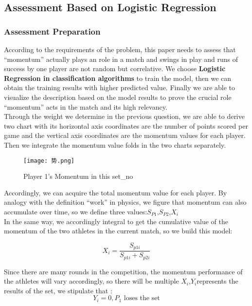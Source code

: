 \documentclass{mcmthesis}
\begin{document}
\subsection{Assessment Based on Logistic Regression}

\subsubsection{Assessment Preparation}
According to the requirements of the problem, this paper needs to assess that “momentum”
actually plays an role in a match and swings in play and runs of success by one player are not
random but correlative. We choose {\bf Logistic Regression in classification algorithms} to train the
model, then we can obtain the training results with higher predicted value. Finally we are able to
visualize the description based on the model results to prove the crucial role “momentum” acts in
the match and its high relevancy.\\
Through the weight we determine in the previous question, we are able to derive two chart
with its horizontal axis coordinates are the number of points scored per game and the vertical axis
coordinates are the momentum values for each player. Then we integrate the momentum value
folds in the two charts separately.

\begin{figure}[htbp]
    \centering
    \texttt{[image: 势.png]}
    \caption{Player 1's Momentum in this set\_no} \label{Figure 12}
\end{figure}

Accordingly, we can acquire the total momentum value for each player. By analogy with the definition “work” in physics, we figure that momentum can also
accumulate over time, so we define three values:$S_{P1}$,$S_{P2}$,$X_{i}$\\
In the same way, we accordingly integral to get the cumulative value of the momentum of the
two athletes in the current match, so we build this model:

\begin{equation} \label{3}
    X_{i}=\frac{S_{p1i}}{S_{p1i}+S_{p2i}}  
\end{equation}

Since there are many rounds in the competition, the momentum performance of the athletes
will vary accordingly, so there will be multiple $X_{i}$,$Y_{i}$represents the results of the set, we stipulate
that :
\begin{equation} \label{4}
    Y_{i} = 0, P_{1} \text{ loses the set}
\end{equation}
\end{document}
